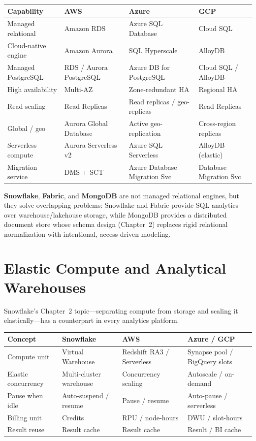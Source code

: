 \begin{center}
\footnotesize
\begin{tabular}{@{}p{2.8cm}p{3.2cm}p{3.2cm}p{3.2cm}@{}}
\toprule
\textbf{Capability} & \textbf{AWS} & \textbf{Azure} & \textbf{GCP} \\
\midrule
Managed relational & Amazon RDS & Azure SQL Database & Cloud SQL \\
Cloud-native engine & Amazon Aurora & SQL Hyperscale & AlloyDB \\
Managed PostgreSQL & RDS / Aurora PostgreSQL & Azure DB for PostgreSQL & Cloud SQL / AlloyDB \\
High availability & Multi-AZ & Zone-redundant HA & Regional HA \\
Read scaling & Read Replicas & Read replicas / geo-replicas & Read Replicas \\
Global / geo & Aurora Global Database & Active geo-replication & Cross-region replicas \\
Serverless compute & Aurora Serverless v2 & Azure SQL Serverless & AlloyDB (elastic) \\
Migration service & DMS + SCT & Azure Database Migration Svc & Database Migration Svc \\
\bottomrule
\end{tabular}
\end{center}

\noindent \textbf{Snowflake}, \textbf{Fabric}, and \textbf{MongoDB} are not managed relational
engines, but they solve overlapping problems: Snowflake and Fabric provide SQL analytics over
warehouse/lakehouse storage, while MongoDB provides a distributed document store whose schema
design (Chapter~2) replaces rigid relational normalization with intentional, access-driven modeling.

\section{Elastic Compute and Analytical Warehouses}
%
Snowflake's Chapter~2 topic---separating compute from storage and scaling it elastically---has a
counterpart in every analytics platform.

\begin{center}
\footnotesize
\begin{tabular}{@{}p{2.8cm}p{3.2cm}p{3.2cm}p{3.2cm}@{}}
\toprule
\textbf{Concept} & \textbf{Snowflake} & \textbf{AWS} & \textbf{Azure / GCP} \\
\midrule
Compute unit & Virtual Warehouse & Redshift RA3 / Serverless & Synapse pool / BigQuery slots \\
Elastic concurrency & Multi-cluster warehouse & Concurrency scaling & Autoscale / on-demand \\
Pause when idle & Auto-suspend / resume & Pause / resume & Auto-pause / serverless \\
Billing unit & Credits & RPU / node-hours & DWU / slot-hours \\
Result reuse & Result cache & Result cache & Result / BI cache \\
\bottomrule
\end{tabular}
\end{center}


